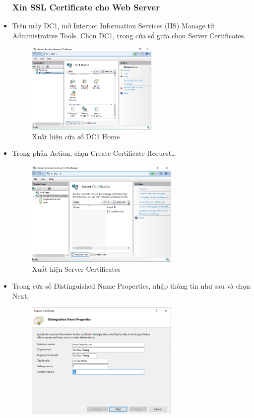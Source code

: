 \documentclass[13pt]{report}
\begin{document}
\begin{itemize}
		\subsubsection{Xin SSL Certificate cho Web Server} 
		\item Trên máy DC1, mở Internet Information Services (IIS) Manage từ Administrative Tools. Chọn DC1, trong cửa sổ giữa chọn Server Certificates.
		\begin{figure}[htp]
			\centering
			\includegraphics[width=0.6\textwidth]{image/Gui/SSL/1.png}
			\caption{Xuất hiện cửa sổ DC1 Home}
		\end{figure}
		\newpage
		\item Trong phần Action, chọn Create Certificate Request…
		\begin{figure}[htp]
			\centering
			\includegraphics[width=0.7\textwidth]{image/Gui/SSL/2.png}
			\caption{Xuất hiện Server Certificates}
		\end{figure}
		\item Trong cửa sổ Distinguished Name Properties, nhập thông tin như sau và chọn Next.
		\begin{figure}[htp]
			\centering
			\includegraphics[width=0.7\textwidth]{image/Gui/SSL/3.png}

\end{figure}
\end{itemize}
\end{document}
